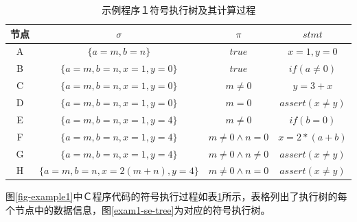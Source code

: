 \begin{table}[ht]
\begin{center}
\caption{示例程序１符号执行树及其计算过程}
\label{exam1-se-table}
\begin{tabular}{| c | c | c | c | }
	\hline
	节点　& $\sigma$ & $\pi$ & $stmt$ \\ 
	\hline		
	A & $ \{a = m, b = n\}$ & $ true$ & $x =1, y=0$ \\
	B & $\{a = m, b = n, x=1, y=0\}$ & $ true$ & $if(a\neq 0)$ \\
	C & $\{a = m, b = n, x=1, y=0\}$ &  $ m\neq 0$ & $y=3+x$ \\
	D & $\{a = m, b = n, x=1, y=0\}$ & $ m = 0$ & $assert(x\neq y)$ \\
	E & $\{a = m, b = n, x=1, y=4\}$ &  $ m\neq 0$ &  $if(b=0)$ \\
	F & $\{a = m, b = n, x=1, y=4\}$ & $ m \neq 0 \wedge n =0 $ & $x = 2*(a+b)$ \\
	G & $\{a = m, b = n, x=1, y=4\}$ & $ m \neq 0 \wedge n \neq 0 $ & $assert(x\neq y)$ \\
	H & $\{a = m, b = n, x=2(m+n), y=4\}$ & $ m \neq 0 \wedge n =0 $ & $assert(x\neq y)$ \\
	\hline  
\end{tabular}

\end{center}
\end{table}


图\ref{fig-example1}中Ｃ程序代码的符号执行过程如表\ref{exam1-se-table}所示，表格列出了执行树的每个节点中的数据信息，图\ref{exam1-se-tree}为对应的符号执行树。

